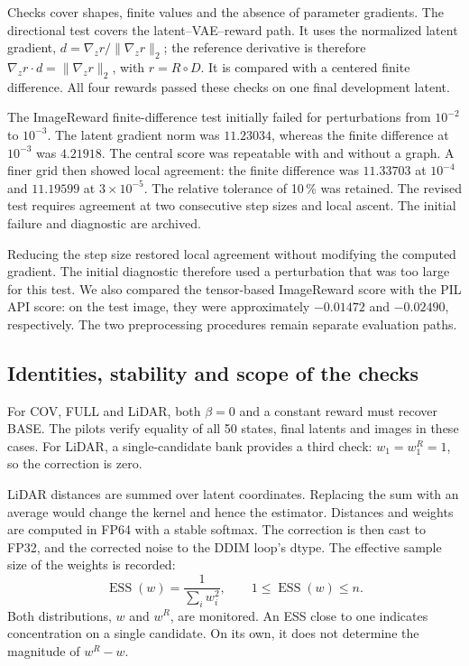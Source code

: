 \documentclass[11pt,a4paper]{article}
\newcommand{\ESS}{\operatorname{ESS}}
\begin{document}
Checks cover shapes, finite values and the absence of parameter gradients. The directional test covers the latent--VAE--reward path. It uses the normalized latent gradient, $d=\nabla_zr/\lVert\nabla_zr\rVert_2$; the reference derivative is therefore $\nabla_zr\cdot d=\lVert\nabla_zr\rVert_2$, with $r=R\circ D$. It is compared with a centered finite difference. All four rewards passed these checks on one final development latent.

The ImageReward finite-difference test initially failed for perturbations from $10^{-2}$ to $10^{-3}$. The latent gradient norm was $11.23034$, whereas the finite difference at $10^{-3}$ was $4.21918$. The central score was repeatable with and without a graph. A finer grid then showed local agreement: the finite difference was $11.33703$ at $10^{-4}$ and $11.19599$ at $3\times10^{-5}$. The relative tolerance of 10\,\% was retained. The revised test requires agreement at two consecutive step sizes and local ascent. The initial failure and diagnostic are archived.

Reducing the step size restored local agreement without modifying the computed gradient. The initial diagnostic therefore used a perturbation that was too large for this test. We also compared the tensor-based ImageReward score with the PIL API score: on the test image, they were approximately $-0.01472$ and $-0.02490$, respectively. The two preprocessing procedures remain separate evaluation paths.

\subsection{Identities, stability and scope of the checks}
For COV, FULL and LiDAR, both $\beta=0$ and a constant reward must recover BASE. The pilots verify equality of all 50 states, final latents and images in these cases. For LiDAR, a single-candidate bank provides a third check: $w_1=w_1^R=1$, so the correction is zero.

LiDAR distances are summed over latent coordinates. Replacing the sum with an average would change the kernel and hence the estimator. Distances and weights are computed in FP64 with a stable softmax. The correction is then cast to FP32, and the corrected noise to the DDIM loop's dtype. The effective sample size of the weights is recorded:
\begin{equation}\label{eq:ess}
\ESS(w)=\frac{1}{\sum_iw_i^2},\qquad 1\leq\ESS(w)\leq n.
\end{equation}
Both distributions, $w$ and $w^R$, are monitored. An ESS close to one indicates concentration on a single candidate. On its own, it does not determine the magnitude of $w^R-w$.
\end{document}
